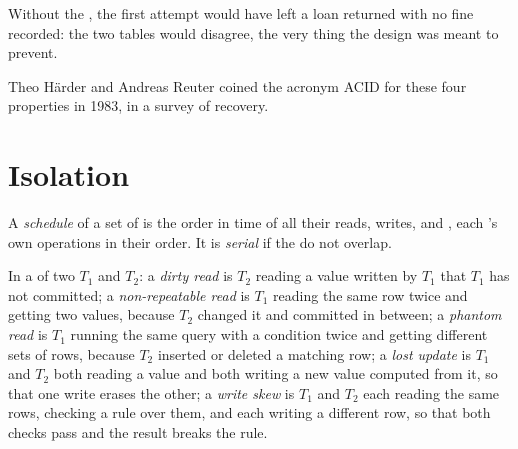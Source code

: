 Without the , the first attempt would have left a loan returned with no fine recorded: the two tables would
disagree, the very thing the design was meant to prevent.

\begin{history}
Theo Härder and Andreas Reuter coined the acronym ACID for these four properties in 1983, in a survey of 
recovery.
\end{history}

\section{Isolation}\label{sec:b2:database-design:isolation}

\begin{definition}[Schedule]\label{def:b2:database-design:schedule}
A \emph{schedule} of a set of  is the order in time of all their reads,
writes,  and , each 's own operations in their order. It is \emph{serial} if the 
do not overlap.
\end{definition}

\begin{definition}\label{def:b2:database-design:anomalies}
In a  of two  $T_1$ and $T_2$: a \emph{dirty read} is $T_2$ reading a value written
by $T_1$ that $T_1$ has not committed; a \emph{non-repeatable read} is $T_1$ reading the same
row twice and getting two values, because $T_2$ changed it and committed in between; a \emph{phantom
read} is $T_1$ running the same query with a condition twice and getting different sets of rows,
because $T_2$ inserted or deleted a matching row; a \emph{lost update} is $T_1$ and $T_2$ both reading a
value and both writing a new value computed from it, so that one write erases the other; a \emph{write
skew} is $T_1$ and $T_2$ each reading the same rows, checking a rule over them, and each writing a
different row, so that both checks pass and the result breaks the rule.
\end{definition}

